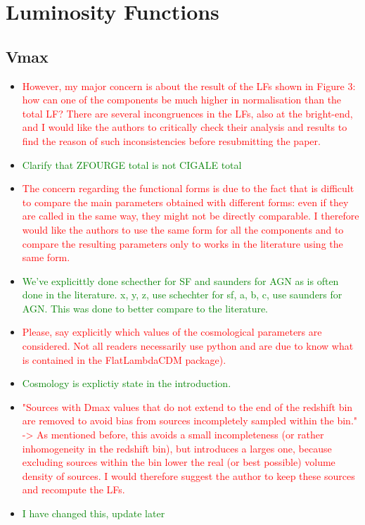 \section{Luminosity Functions} \label{Sec: Luminosity Functions}
\subsection{Vmax} \label{Sec: Vmax}

\begin{itemize}
    \item \textcolor{red}{However, my major concern is about the result of the LFs shown in Figure 3: how can one of the components be much higher in normalisation than the total LF? There are several incongruences in the LFs, also at the bright-end, and I would like the authors to critically check their analysis and results to find the reason of such inconsistencies before resubmitting the paper.}
    \item \textcolor{Green}{Clarify that ZFOURGE total is not CIGALE total}
    \vspace{0.5cm}

    
    \item \textcolor{red}{The concern regarding the functional forms is due to the fact that is difficult to compare the main parameters obtained with different forms: even if they are called in the same way, they might not be directly comparable. I therefore would like the authors to use the same form for all the components and to compare the resulting parameters only to works in the literature using the same form.}
    \item \textcolor{green}{We've explicittly done schecther for SF and saunders for AGN as is often done in the literature. x, y, z, use schechter for sf, a, b, c, use saunders for AGN. This was done to better compare to the literature.}
    
    \item \textcolor{red}{Please, say explicitly which values of the cosmological parameters are considered. Not all readers necessarily use python and are due to know what is contained in the FlatLambdaCDM package).}
    \item \textcolor{green}{Cosmology is explictiy state in the introduction.}
    
    \item \textcolor{red}{"Sources with Dmax values that do not extend to the end of the redshift bin are removed to avoid bias from sources incompletely sampled within the bin." -> As mentioned before, this avoids a small incompleteness (or rather inhomogeneity in the redshift bin), but introduces a larges one, because excluding sources within the bin lower the real (or best possible) volume density of sources. I would therefore suggest the author to keep these sources and recompute the LFs.}
    \item \textcolor{green}{I have changed this, update later}
    

\end{itemize}
